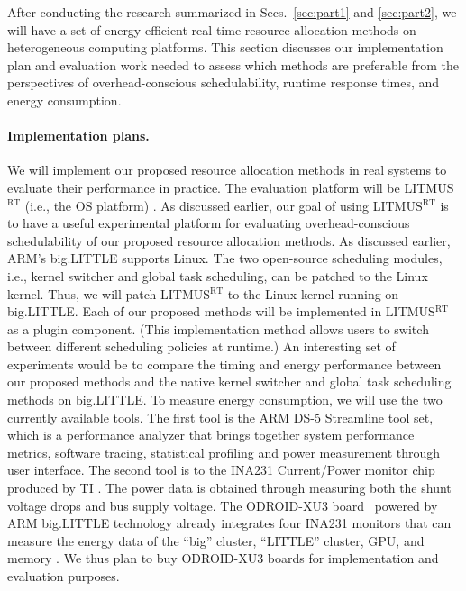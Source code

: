 After conducting the research summarized in Secs.~\ref{sec:part1} and \ref{sec:part2}, we will have a set of energy-efficient real-time resource allocation methods on heterogeneous computing platforms. This section discusses our implementation plan and evaluation work needed to assess which methods are preferable from the perspectives of overhead-conscious schedulability, runtime response times, and energy consumption. 

\vspace{-2mm} \paragraph{Implementation plans.} We will implement our proposed resource allocation methods in real systems to evaluate their performance in practice. The evaluation platform will be LITMUS$^{\textrm{RT}}$ (i.e., the OS platform) \cite{LITMUS}. As discussed earlier, our goal of using LITMUS$^{\textrm{RT}}$ is to have a useful experimental platform for evaluating overhead-conscious schedulability of our proposed resource allocation methods. 
As discussed earlier, ARM's big.LITTLE supports Linux. The two open-source scheduling modules, i.e., kernel switcher and global task scheduling, can be patched to the Linux kernel. Thus, we will patch LITMUS$^{\textrm{RT}}$ to the Linux kernel running on big.LITTLE. 
Each of our proposed methods  will be implemented in LITMUS$^{\textrm{RT}}$ as a plugin component. (This implementation method allows users to switch between different scheduling policies at runtime.) An interesting set of experiments would be to compare the timing and energy performance between our proposed methods and the native kernel switcher and global task scheduling methods on big.LITTLE. To measure energy consumption, we will use the two currently available tools. The first tool is the ARM DS-5 Streamline tool set\cite{ARMDS5}, which is a performance analyzer that brings together system performance metrics, software tracing, statistical profiling and power measurement through user interface. The second tool is to the INA231 Current/Power monitor chip produced by TI \cite{israelssonenergy, INA231, hahnel2014heterogeneity}. The power data is obtained through measuring both the shunt voltage drops and bus supply voltage. The ODROID-XU3 board~\cite{ODROIDXU} powered by ARM big.LITTLE technology already integrates four INA231 monitors that can measure the energy data of the ``big'' cluster, ``LITTLE'' cluster, GPU, and memory \cite{hahnel2014heterogeneity}. We thus plan to buy ODROID-XU3 boards for implementation and evaluation purposes.

